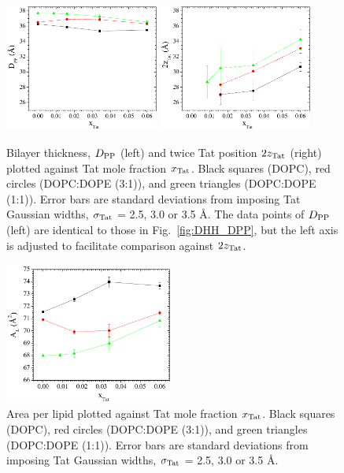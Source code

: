 \begin{figure}[htbp]
  \centering
  \includegraphics[width=0.45\textwidth]{figures/Tat/SDP_Results/DPP2}
  \qquad
  \includegraphics[width=0.45\textwidth]{figures/Tat/SDP_Results/2zTat}
  \caption[Bilayer thickness, $\DPP$ (left) and twice Tat position $2\zTat$ (right)
  plotted against Tat mole fraction $\xTat$]
  {Bilayer thickness, $\DPP$ (left) and twice Tat position $2\zTat$ (right)
  plotted against Tat mole fraction $\xTat$.
  Black squares (DOPC), red circles (DOPC:DOPE (3:1)), and green
  triangles (DOPC:DOPE (1:1)).
  Error bars are standard deviations from imposing Tat Gaussian widths, 
  $\sigma_\textrm{Tat}$ = 2.5, 3.0 or 3.5 \AA. The data points of $\DPP$ (left) are 
  identical to those in Fig.~\ref{fig:DHH_DPP}, but the left axis is adjusted
  to facilitate comparison against $2\zTat$.}
  \label{fig:DPP_2zTat}
\end{figure}

\begin{figure}[htbp]
  \centering
  \includegraphics[width=0.49\textwidth]{figures/Tat/SDP_Results/AL}
  \caption[Area per lipid plotted against Tat mole fraction $\xTat$]
  {Area per lipid plotted against Tat mole fraction $\xTat$.
  Black squares (DOPC), red circles (DOPC:DOPE (3:1)), and green
  triangles (DOPC:DOPE (1:1)).
  Error bars are standard deviations from imposing Tat Gaussian widths, 
  $\sigma_\textrm{Tat}$ = 2.5, 3.0 or 3.5 \AA.}
  \label{fig:AL}
\end{figure}


